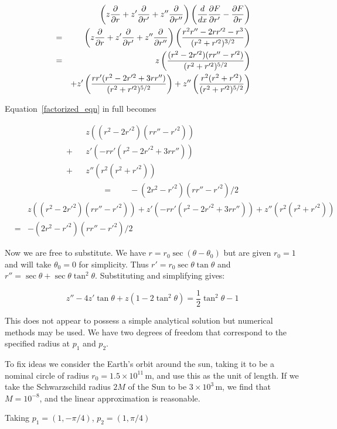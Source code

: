 \documentclass[pdflatex,sn-mathphys-num]{sn-jnl}%
\theoremstyle{thmstyleone}%
\theoremstyle{thmstyletwo}%
\theoremstyle{thmstylethree}%
\begin{document}
\begin{eqnarray}
&{}& \left(z\frac{\partial{}}{\partial{r}} + z'\frac{\partial{}}{\partial{r'}} + z''\frac{\partial{}}{\partial{r''}}\right)
\left(\frac{d}{dx}\frac{\partial{F}}{\partial{r'}}
-\frac{\partial{F}}{\partial{r}}\right)\nonumber\\
&=&  \left(z\frac{\partial{}}{\partial{r}} + z'\frac{\partial{}}{\partial{r'}} + z''\frac{\partial{}}{\partial{r''}}\right)
\left(\frac{r^2r''- 2rr'^2 -r^3}{(r^2 +r'^2)^{3/2}}\right)\nonumber\\
&=& 
 z  \left(\frac{(r^2 - 2r'^2)(rr''-r'^2)}{(r^2 + r'^2)^{5/2}}\right)\nonumber\\
 &{}& + z' \left(\frac{rr'(r^2 - 2r'^2 + 3rr'')}{(r^2 + r'^2)^{5/2}}\right)
      + z''\left(\frac{r^2    (r^2+r'^2)       }{(r^2 + r'^2)^{5/2}}\right)
\end{eqnarray}

Equation~\ref{factorized_eqn} in full becomes

\begin{eqnarray}
 &{}&z   \left((r^2 - 2r'^2)(rr''-r'^2)\right)\nonumber\\
+&{}&z'  \left(-rr'(r^2 - 2r'^2 + 3rr'')\right)\nonumber\\
+&{}&z'' \left(r^2    (r^2+r'^2)       \right)\nonumber\\
&{}&\qquad =\qquad -(2r^2-r'^2)(rr''-r'^2)/2
\end{eqnarray}
\begin{eqnarray}
  &{}&
  z   \left((r^2 - 2r'^2)(rr''-r'^2)\right)
  +z'  \left(-rr'(r^2 - 2r'^2 + 3rr'')\right)
  +z'' \left(r^2    (r^2+r'^2)       \right)\nonumber\\
 &=& -(2r^2-r'^2)(rr''-r'^2)/2
\end{eqnarray}

Now we are free to substitute.  We have $r=r_0\sec(\theta-\theta_0)$
but are given $r_0=1$ and will take $\theta_0=0$ for simplicity.  Thus
$r'= r_0\sec\theta\tan\theta$ and $r''=\sec\theta +
\sec\theta\tan^2\theta$.  Substituting and simplifying gives:

\begin{equation}\label{string_ODE}
z'' - 4z'\tan \theta + z(1-2\tan^2\theta) = {\scriptstyle\frac{1}{2}}\tan^2\theta - 1
\end{equation}

This does not appear to possess a simple analytical solution but
numerical methods may be used.  We have two degrees of freedom that
correspond to the specified radius at $p_1$ and $p_2$.

To fix ideas we consider the Earth's orbit around the sun, taking it
to be a nominal circle of radius $r_0=1.5\times 10^{11}\,\mathrm{m}$,
and use this as the unit of length.  If we take the Schwarzschild
radius $2M$ of the Sun to be $3\times 10^3\,\mathrm{m}$, we find that
$M=10^{-8}$, and the linear approximation is reasonable.

Taking $p_1=(1,-\pi/4)$, $p_2=(1,\pi/4)$



\end{document}
